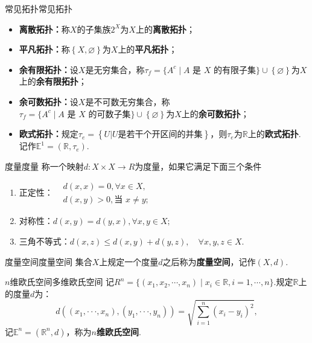 \documentclass{ctexart}
\begin{document}
\begin{命题}{常见拓扑}{常见拓扑}
	{
	\begin{itemize}
		\item \textbf{离散拓扑：}称$X$的子集族$2^X$为$X$上的\textbf{离散拓扑}；
		\item \textbf{平凡拓扑：}称$\left\lbrace X,\varnothing \right\rbrace $为$X$上的\textbf{平凡拓扑}；
		\item \textbf{余有限拓扑：}设$X$是无穷集合，称$\tau_f=\{A^c\mid A\text{ 是 }X\text{ 的有限子集}\}\cup \left\lbrace \varnothing \right\rbrace $为$X$上的\textbf{余有限拓扑}；
		\item \textbf{余可数拓扑：}设$X$是不可数无穷集合，称$\tau_f=\{A^c\mid A\text{ 是 }X\text{ 的可数子集}\}\cup \left\lbrace \varnothing \right\rbrace $为$X$上的\textbf{余可数拓扑}；
		\item \textbf{欧式拓扑：}规定$\tau_e  = \left\lbrace U|U\text{是若干个开区间的并集} \right\rbrace $，则$\tau_e $为$\mathbb{R}$上的\textbf{欧式拓扑}.记作$\mathbb{E}^1 = (\mathbb{R},\tau_e)$.
	\end{itemize}
	}
\end{命题}
\begin{定义}{度量}{度量}
	称一个映射$d:X\times X{\rightarrow}R $为度量，如果它满足下面三个条件
	\begin{enumerate}[label=(\arabic*)]
		\item 正定性：$\begin{aligned}&d(x,x)=0,\forall x\in X\text{,}\\&d(x,y)>0,\text{当 }x\neq y;\end{aligned}$
		\item 对称性：$d(x,y)=d(y,x),\forall x,y\in X;$
		\item 三角不等式：$d(x,z)\leqslant d(x,y)+d(y,z),\quad\forall x,y,z\in X. $
	\end{enumerate}
\end{定义}
\begin{定义}{度量空间}{度量空间}
	集合$X$上规定一个度量$d$之后称为\textbf{度量空间}，记作$(X,d).$
\end{定义}
\begin{定义}{$n$维欧氏空间}{多维欧氏空间}
	记$R^n=\{(x_1,x_2,\cdots,x_n)\mid x_i\in\mathbb{R},i=1,\cdots,n\}.$规定$\mathbb{R}$上的度量$d$为：$$d((x_1,\cdotp\cdotp\cdotp,x_n),(y_1,\cdotp\cdotp\cdotp,y_n))=\sqrt{\sum_{i=1}^n{(x_i-y_i)^2}}, $$记$\mathbb{E}^n=(\mathbb{R}^n,d)$，称为\textbf{$n$维欧氏空间}.
\end{定义}
\end{document}
